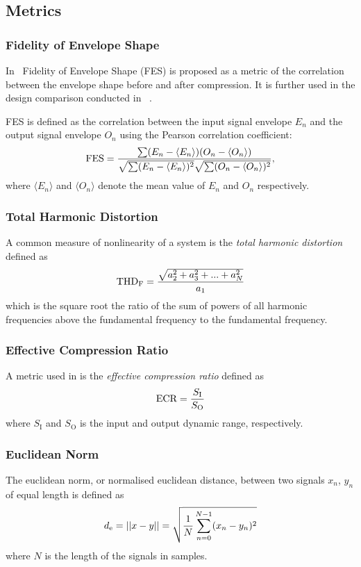 \documentclass[../main2.tex]{subfiles}
\begin{document}
\subsection{Metrics}\label{theory_metrics}

\subsubsection{Fidelity of Envelope Shape} \label{fes}
In~\cite{stone2007quantifying} Fidelity of Envelope Shape (FES) is proposed as a metric of the correlation between the envelope shape before and after compression. It is further used in the design comparison conducted in ~\cite{reiss2012tutorial}.

FES is defined as the correlation between the input signal envelope $E_n$ and the output signal envelope $O_n$ using the Pearson correlation coefficient: \begin{equation}
\text{FES} = \dfrac{\sum(E_n - \langle E_n \rangle)(O_n - \langle O_n \rangle)}{\sqrt{\sum(E_n -\langle E_n \rangle )^2}\sqrt{\sum(O_n - \langle O_n \rangle )^2}},
\end{equation}
where $\langle E_n \rangle$ and $\langle O_n \rangle$ denote the mean value of $E_n$ and $O_n$ respectively.

\subsubsection{Total Harmonic Distortion}
A common measure of nonlinearity of a system is the \emph{total harmonic distortion} defined as \cite{shmilovitz2005definition}
\begin{align}
\text{THD}_\text{F} = \dfrac{\sqrt{a_2^2 + a_3^2 + ... + a_N^2}}{a_1}
\end{align}
which is the square root the ratio of the sum of powers of all harmonic frequencies above the fundamental frequency to the fundamental frequency.

\subsubsection{Effective Compression Ratio}
A metric used in \cite{stone1992syllabic} is the \emph{effective compression ratio} defined as
\begin{align}
\text{ECR} = \dfrac{S_\text{I}}{S_\text{O}}
\end{align}
where $S_\text{I}$ and $S_\text{O}$ is the input  and output dynamic range, respectively.

\subsubsection{Euclidean Norm}
The euclidean norm, or normalised euclidean distance, between two signals $x_n$, $y_n$ of equal length is defined as
\begin{align}
d_\text{e} = ||x-y|| = \sqrt{\frac{1}{N}\sum_{n=0}^{N-1}(x_n-y_n)^2}
\end{align}
where $N$ is the length of the signals in samples.
\end{document}
